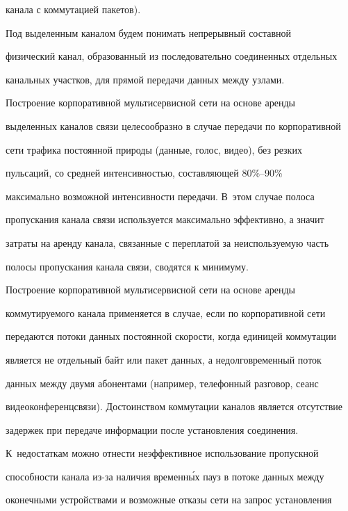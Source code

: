 канала с коммутацией пакетов).


     


     Под выделенным каналом будем понимать непрерывный составной 


физический канал, образованный из последовательно соединенных отдельных 


канальных участков, для прямой передачи данных между узлами. 


     


     Построение корпоративной мультисервисной сети на основе аренды  


выделенных каналов связи целесообразно в случае передачи по корпоративной 


сети трафика постоянной природы (данные, голос, видео), без резких 


пульсаций, со средней интенсивностью, составляющей 80\%--90\%  


максимально возможной интенсивности передачи. В~этом случае полоса 


пропускания канала связи используется максимально эффективно, а значит 


затраты на аренду канала, связанные с переплатой за неиспользуемую часть 


полосы пропускания канала связи, сводятся к минимуму.


     


     Построение корпоративной мультисервисной сети на основе аренды 


коммутируемого канала применяется в случае, если по корпоративной сети 


передаются потоки данных постоянной скорости, когда единицей коммутации 


является не отдельный байт или пакет данных, а недолговременный поток 


данных между двумя абонентами (например, телефонный разговор, сеанс 


видеоконференцсвязи). Достоинством коммутации каналов является отсутствие 


задержек при передаче информации после установления соединения. 


К~недостаткам можно отнести неэффективное использование пропускной 


способности канала из-за наличия временн\'{ы}х пауз в потоке данных между 


оконечными устройствами и возможные отказы сети на запрос установления 


